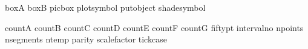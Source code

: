 \newskip\headingtoplotskip      %
\newskip\linethickness         %
\newskip\longticklength         %
\newskip\plotsymbolspacing     %
\newskip\shortticklength        %
\newskip\stackleading           %
\newskip\tickstovaluesleading   %
\newskip\totalarclength        %
\newskip{}   %

\newbox\!boxA                   %
\newbox\!boxB                   %
\newbox\!picbox                 %
\newbox\!plotsymbol             %
\newbox\!putobject              %
\newbox\!shadesymbol            %

\newcount\!countA               %
\newcount\!countB               %
\newcount\!countC               %
\newcount\!countD               %
\newcount\!countE               %
\newcount\!countF               %
\newcount\!countG               %
\newcount\!fiftypt              %
\newcount\!intervalno           %
\newcount\!npoints              %
\newcount\!nsegments            %
\newcount\!ntemp                %
\newcount\!parity               %
\newcount\!scalefactor          %
\newcount\!tickcase             %

